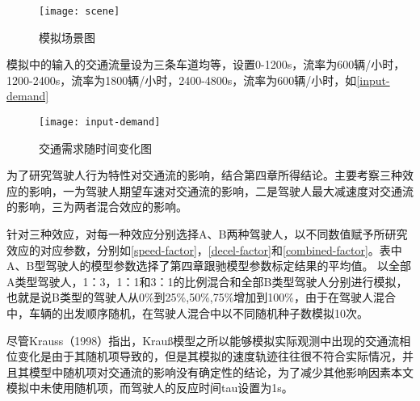 \begin{figure}[!htb]
\begin{center}
\texttt{[image: scene]}
\end{center}
\caption{模拟场景图}
\label{scene}
\end{figure}

模拟中的输入的交通流量设为三条车道均等，设置0-1200s，流率为600辆/小时，1200-2400s，流率为1800辆/小时，2400-4800s，流率为600辆/小时，如\autoref{input-demand}

\begin{figure}[!htb]
\begin{center}
\texttt{[image: input-demand]}
\end{center}
\caption{交通需求随时间变化图}
\label{input-demand}
\end{figure}

为了研究驾驶人行为特性对交通流的影响，结合第四章所得结论。主要考察三种效应的影响，一为驾驶人期望车速对交通流的影响，二是驾驶人最大减速度对交通流的影响，三为两者混合效应的影响。



针对三种效应，对每一种效应分别选择A、B两种驾驶人，以不同数值赋予所研究效应的对应参数，分别如\autoref{speed-factor}，\autoref{decel-factor}和\autoref{combined-factor}。表中A、B型驾驶人的模型参数选择了第四章跟驰模型参数标定结果的平均值。
以全部A类型驾驶人，1：3，1：1和3：1的比例混合和全部B类型驾驶人分别进行模拟，也就是说B类型的驾驶人从0\%到25\%,50\%,75\%增加到100\%，由于在驾驶人混合中，车辆的出发顺序随机，在驾驶人混合中以不同随机种子数模拟10次。

尽管Krauss（1998）\cite{Krauss1998}指出，Krauß模型之所以能够模拟实际观测中出现的交通流相位变化是由于其随机项导致的，但是其模拟的速度轨迹往往很不符合实际情况，并且其模型中随机项对交通流的影响没有确定性的结论，为了减少其他影响因素本文模拟中未使用随机项，而驾驶人的反应时间tau设置为1s。

